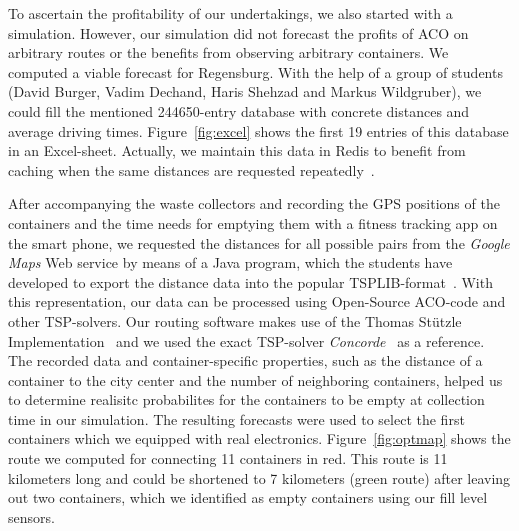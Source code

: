 \documentclass[10pt]{article}
\begin{document}
To ascertain the profitability of our undertakings, we also started with a simulation.
However, our simulation did not forecast the profits of ACO on arbitrary routes or the
benefits from observing arbitrary containers. We computed a viable forecast for Regensburg.
With the help of a group of students (David Burger, Vadim Dechand, 
Haris Shehzad and Markus Wildgruber), we could fill the mentioned 
244650-entry database with concrete distances and average driving times. 
Figure~\ref{fig:excel} shows the first 19 entries of this database in an
Excel-sheet. Actually, we maintain this data in Redis to benefit from caching
when the same distances are requested repeatedly~\cite{Carlson13}. 

After accompanying
the waste collectors and recording the GPS positions of the containers and the time needs 
for emptying them with a fitness tracking app on the smart phone, we requested the
distances for all possible pairs from the {\it Google Maps} Web service by means of a 
Java program, which the students have developed to export the distance data into the
popular TSPLIB-format~\cite{tsplib90}. With this representation, our data can be 
processed using Open-Source ACO-code and other TSP-solvers. Our routing software makes
use of the Thomas St{\"u}tzle Implementation~\cite{Dorigo97} and we used the exact 
TSP-solver {\it Concorde}~\cite{applegate01} as a reference. 
The recorded data and container-specific properties, such as the distance of
a container to the city center and the number of neighboring containers, helped 
us to determine realisitc probabilites for the containers to be empty at collection
time in our simulation. The resulting forecasts were used to select the first 
containers which we equipped with real electronics.
Figure~\ref{fig:optmap}
shows the route we computed for connecting 11 containers in red. This route is 
11 kilometers long and could be shortened to 7 kilometers (green route) after
leaving out two containers, which we identified as empty containers using 
our fill level sensors.
\end{document}
